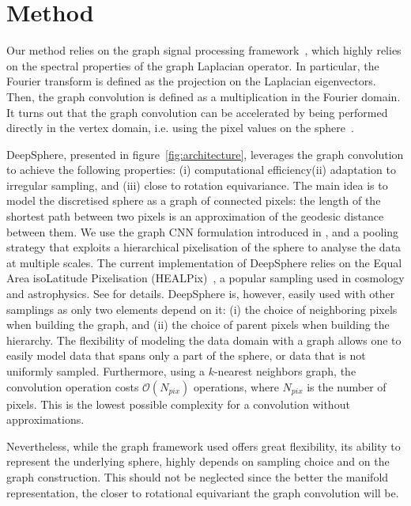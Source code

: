 \documentclass{article} %
\newcommand{\figref}[1]{figure~\ref{fig:#1}}
\newcommand{\1}{\b{1}}              %
\newcommand{\0}{\b{0}}              %
\newcommand{\todo}[1]{{\color[rgb]{.6,.1,.6}{#1}}}
\begin{document}
\section{Method}

Our method relies on the graph signal processing framework~\cite{shuman2013gsp}, which highly relies on the spectral properties of the graph Laplacian operator. 
In particular, the Fourier transform is defined as the projection on the Laplacian eigenvectors. Then, the graph convolution is defined as a multiplication in the Fourier domain. 
It turns out that the graph convolution can be accelerated by being performed directly in the vertex domain, i.e. using the pixel values on the sphere~\cite{hammond2011wavelets}.

DeepSphere, presented in \figref{architecture}, leverages the graph convolution
to achieve the following properties: (i) computational efficiency(ii) adaptation to irregular sampling, and (iii) close to rotation equivariance.
The main idea is to model the discretised sphere as a graph of connected pixels: the length of the shortest path between two pixels is an approximation of the geodesic distance between them.
We use the graph CNN formulation introduced in \citep{defferrard2016convolutional}, and a pooling strategy that exploits a hierarchical pixelisation of the sphere to analyse the data at multiple scales.
The current implementation of DeepSphere relies on the Equal Area isoLatitude Pixelisation (HEALPix)~\citep{gorski2005healpix}, a popular sampling used in cosmology and astrophysics. 
See \citet{perraudin2018deepsphere} for details.
DeepSphere is, however, easily used with other samplings as only two elements depend on it: (i) the choice of neighboring pixels when building the graph, and (ii) the choice of parent pixels when building the hierarchy.
The flexibility of modeling the data domain with a graph allows one to easily model data that spans only a part of the sphere, or data that is not uniformly sampled. 
Furthermore, using a $k$-nearest neighbors graph, the convolution operation costs $\mathcal{O}(N_{pix})$ operations, where $N_{pix}$ is the number of pixels.
This is the lowest possible complexity for a convolution without approximations.

Nevertheless, while the graph framework used offers great flexibility, its ability to represent the underlying sphere, highly depends on sampling choice and on the graph construction.
This should not be neglected since the better the manifold representation, the closer to rotational equivariant the graph convolution will be. 
\end{document}
